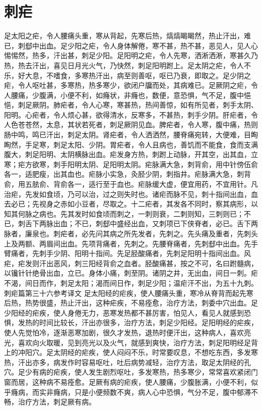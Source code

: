 \documentclass[a4paper,12pt,UTF8,twoside]{ctexbook}
\begin{document}
\chapter{刺疟}
足太阳之疟，令人腰痛头重，寒从背起，先寒后热，熇熇暍暍然，热止汗出，难已，刺郄中出血。足少阳之疟，令人身体解倦，寒不甚，热不甚，恶见人，见人心惕惕然，热多，汗出甚，刺足少阳。足阳明之疟，令人先寒，洒淅洒淅，寒甚久乃热，热去汗出，喜见日月光火气，乃快然，刺足阳明跗上。足太阴之疟，令人不乐，好大息，不嗜食，多寒热汗出，病至则善呕，呕已乃衰，即取之。足少阴之疟，令人呕吐甚，多寒热，热多寒少，欲闭户牖而处，其病难已。足厥阴之疟，令人腰痛，少腹满，小便不利，如癃状，非癃也，数便，意恐惧，气不足，腹中悒悒，刺足厥阴。肺疟者，令人心寒，寒甚热，热间善惊，如有所见者，刺手太阴、阳明。心疟者，令人烦心甚，欲得清水，反寒多，不甚热，刺手少阴。肝疟者，令人色苍苍然，太息，其状若死者，刺足厥阴见血。脾疟者，令人寒，腹中痛，热则肠中鸣，鸣已汗出，刺足太阴。肾疟者，令人洒洒然，腰脊痛宛转，大便难，目眴眴然，手足寒，刺足太阳、少阴。胃疟者，令人且病也，善饥而不能食，食而支满腹大，刺足阳明、太阴横脉出血。疟发身方热，刺跗上动脉，开其空，出其血，立寒；疟方欲寒，刺手阳明太阴、足阳明太阴。疟脉满大急，刺背俞，用中针傍伍俞各一，适肥瘦，出其血也。疟脉小实急，灸胫少阴，刺指井。疟脉满大急，刺背俞，用五胠俞、背俞各一，适行至于血也。疟脉缓大虚，便宜用药，不宜用针。凡治疟，先发如食顷，乃可以治，过之则失时也。诸疟而脉不见，刺十指间出血，血去必已；先视身之赤如小豆者，尽取之。十二疟者，其发各不同时，察其病形，以知其何脉之病也。先其发时如食顷而刺之，一刺则衰，二刺则知，三刺则已；不已，刺舌下两脉出血；不已，刺郄中盛经出血，又刺项已下侠脊者，必已。舌下两脉者，廉泉也。刺疟者，必先问其病之所先发者，先刺之。先头痛及重者，先刺头上及两额、两眉间出血。先项背痛者，先刺之。先腰脊痛者，先刺郄中出血。先手臂痛者，先刺手少阴、阳明十指间。先足胫酸痛者，先刺足阳明十指间出血。风疟，疟发则汗出恶风，刺三阳经背俞之血者。胫酸痛甚，按之不可，名曰跗髓病，以镵针针绝骨出血，立已。身体小痛，刺至阴。诸阴之井，无出血，间日一刺。疟不渴，间日而作，刺足太阳；渴而间日作，刺足少阳；温疟汗不出，为五十九刺。
刺疟篇第三十六参考译文
足太阳经的疟疾，使人腰痛头重，寒冷从脊背而起先寒后热，热势很盛，热止汗出，这种疟疾，不易痊愈，治疗方法，刺委中穴出血。足少阳经的疟疾，使人身倦无力，恶寒发热都不甚厉害，怕见人，看见人就感到恐惧，发热的时间比较长，汗出亦很多，治疗方法，刺足少阳经。足阳明经的疟疾，使人先觉怕冷，逐渐恶寒加剧，很久才发热，退热时便汗出，这种病人，喜欢亮光，喜欢向火取暖，见到亮光以及火气，就感到爽快，治疗方法，刺足阳明经足背上的冲阳穴。足太阴经的疟疾，使人闷闷不乐，时常要叹息，不想吃东西，多发寒热，汗出亦多，病发作时容易呕吐，吐后病势减轻，治疗方法，取足太阴经的孔穴。足少有病的疟疾，使人发生剧烈呕吐，多发寒热，热多寒少，常常喜欢紧闭门窗而居，这种病不易痊愈。足厥有病的疟疾，使人腰痛，少腹胀满，小便不利，似乎癃病，而实非癃病，只是小便频数不爽，病人心中恐惧，气分不足，腹中郁滞不畅，治疗方法，刺足厥有病。
\end{document}
